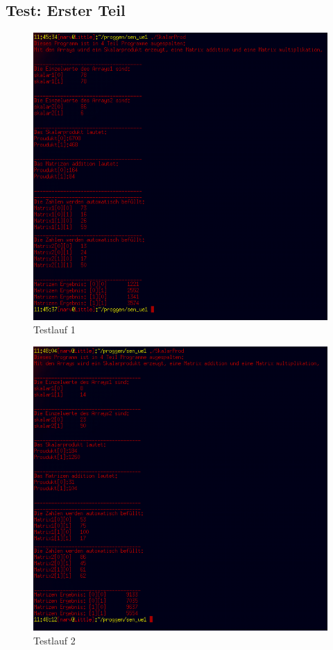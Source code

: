 \documentclass{scrartcl}
\begin{document}
\subsection{Test: Erster Teil}
\begin{figure}[H]
  \centering
  \includegraphics[width=0.9\linewidth]{images/test1.png}
  \caption{Testlauf 1}
  \label{fig:digraph}
\end{figure}

\begin{figure}[H]
  \centering
  \includegraphics[width=0.9\linewidth]{images/test2.png}
  \caption{Testlauf 2}
  \label{fig:digraph}
\end{figure}
\end{document}
